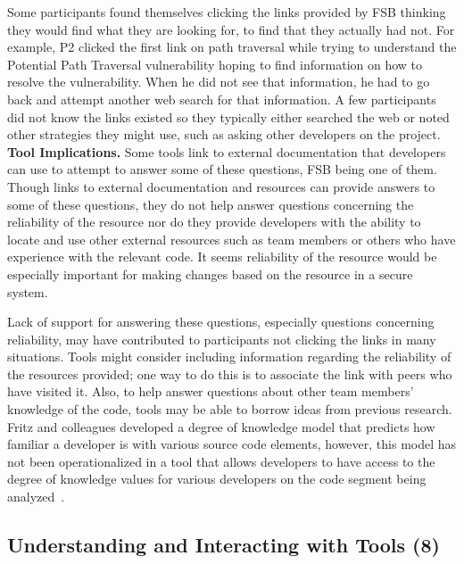 \documentclass[conference]{IEEEtran}
\begin{document}
Some participants found themselves clicking the links provided by FSB thinking they would find what they are looking for, to find that they actually had not. 
For example, P2 clicked the first link on path traversal while trying to understand the Potential Path Traversal vulnerability hoping to find information on how to resolve the vulnerability.
When he did not see that information, he had to go back and attempt another web search for that information. 
A few participants did not know the links existed so they typically either searched the web or noted other strategies they might use, such as asking other developers on the project.
\\

\noindent\textbf{Tool Implications.}
Some tools link to external documentation that developers can use to attempt to answer some of these questions, FSB being one of them. 
Though links to external documentation and resources can provide answers to some of these questions, they do not help answer questions concerning the reliability of the resource nor do they provide developers with the ability to locate and use other external resources such as team members or others who have experience with the relevant code.
It seems reliability of the resource would be especially important for making changes based on the resource in a secure system.

Lack of support for answering these questions, especially questions concerning reliability, may have contributed to participants not clicking the links in many situations.  
Tools might consider including information regarding the reliability of the resources provided; one way to do this is to associate the link with peers who have visited it.
Also, to help answer questions about other team members' knowledge of the code, tools may be able to borrow ideas from previous research.
Fritz and colleagues developed a degree of knowledge model that predicts how familiar a developer is with various source code elements, however, this model has not been operationalized in a tool that allows developers to have access to the degree of knowledge values for various developers on the code segment being analyzed~\cite{fritz2010degree}.




\noindent\subsection{\textbf{Understanding and Interacting with Tools (8)}}\label{uit}
\end{document}
